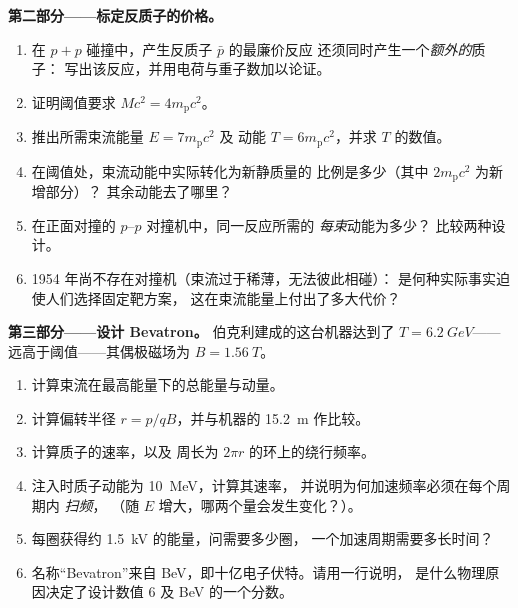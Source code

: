 \begin{problem}
\medskip\noindent\textbf{第二部分——标定反质子的价格。}
\begin{enumerate}[resume]
  \item 在 $p + p$ 碰撞中，产生反质子 $\bar p$ 的最廉价反应
        还须同时产生一个\emph{额外的}质子：
        写出该反应，并用电荷与重子数加以论证。
  \item 证明阈值要求 $Mc^2 = 4m_{\text{p}}c^2$。
  \item 推出所需束流能量 $E = 7m_{\text{p}}c^2$ 及
        动能 $T = 6m_{\text{p}}c^2$，并求 $T$ 的数值。
  \item 在阈值处，束流动能中实际转化为新静质量的
        比例是多少（其中 $2m_{\text{p}}c^2$ 为新增部分）？
        其余动能去了哪里？
  \item 在正面对撞的 $p$--$p$ 对撞机中，同一反应所需的
        \emph{每束}动能为多少？
        比较两种设计。
  \item 1954 年尚不存在对撞机（束流过于稀薄，无法彼此相碰）：
        是何种实际事实迫使人们选择固定靶方案，
        这在束流能量上付出了多大代价？
\end{enumerate}

\medskip\noindent\textbf{第三部分——设计 Bevatron。}
伯克利建成的这台机器达到了 $T = \qty{6.2}{GeV}$——
远高于阈值——其偶极磁场为 $B =
\qty{1.56}{T}$。
\begin{enumerate}[resume]
  \item 计算束流在最高能量下的总能量与动量。
  \item 计算偏转半径 $r = p/qB$，并与机器的
        \qty{15.2}{m} 作比较。
  \item 计算质子的速率，以及
        周长为 $2\pi r$ 的环上的绕行频率。
  \item 注入时质子动能为 \qty{10}{MeV}，计算其速率，
        并说明为何加速频率必须在每个周期内
        \emph{扫频}，
        （随 $E$ 增大，哪两个量会发生变化？）。
  \item 每圈获得约 \qty{1.5}{kV} 的能量，问需要多少圈，
        一个加速周期需要多长时间？
  \item 名称“Bevatron”来自 BeV，即十亿电子伏特。请用一行说明，
        是什么物理原因决定了设计数值 $6$
        及 BeV 的一个分数。
\end{enumerate}


\end{problem}
